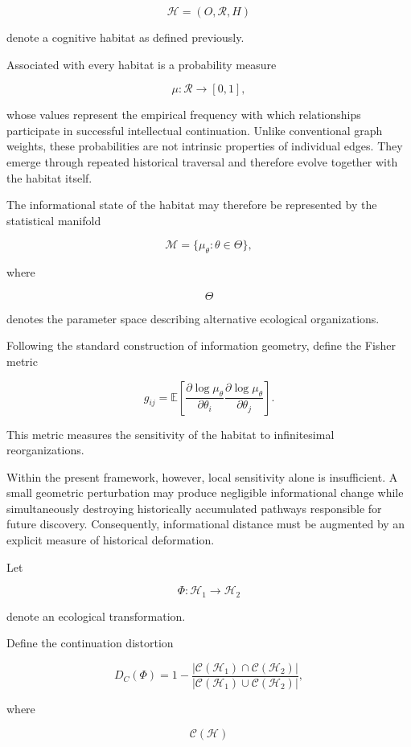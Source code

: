 \documentclass[12pt,oneside]{article}
\theoremstyle{remark}
\begin{document}
\[
\mathcal{H}
=
(O,\mathcal{R},H)
\]

denote a cognitive habitat as defined previously.

Associated with every habitat is a probability measure

\[
\mu
:
\mathcal{R}
\rightarrow
[0,1],
\]

whose values represent the empirical frequency with which relationships
participate in successful intellectual continuation. Unlike conventional graph
weights, these probabilities are not intrinsic properties of individual edges.
They emerge through repeated historical traversal and therefore evolve together
with the habitat itself.

The informational state of the habitat may therefore be represented by the
statistical manifold

\[
\mathcal{M}
=
\{
\mu_\theta
:
\theta
\in
\Theta
\},
\]

where

\[
\Theta
\]

denotes the parameter space describing alternative ecological organizations.

Following the standard construction of information geometry, define the Fisher
metric

\[
g_{ij}
=
\mathbb{E}
\left[
\frac{\partial\log\mu_\theta}{\partial\theta_i}
\frac{\partial\log\mu_\theta}{\partial\theta_j}
\right].
\]

This metric measures the sensitivity of the habitat to infinitesimal
reorganizations.

Within the present framework, however, local sensitivity alone is insufficient.
A small geometric perturbation may produce negligible informational change while
simultaneously destroying historically accumulated pathways responsible for
future discovery. Consequently, informational distance must be augmented by an
explicit measure of historical deformation.

Let

\[
\Phi
:
\mathcal{H}_1
\rightarrow
\mathcal{H}_2
\]

denote an ecological transformation.

Define the continuation distortion

\[
D_C(\Phi)
=
1-
\frac{
|
\mathcal{C}(\mathcal{H}_1)
\cap
\mathcal{C}(\mathcal{H}_2)
|
}{
|
\mathcal{C}(\mathcal{H}_1)
\cup
\mathcal{C}(\mathcal{H}_2)
|
},
\]

where

\[
\mathcal C(\mathcal H)
\]
\end{document}
